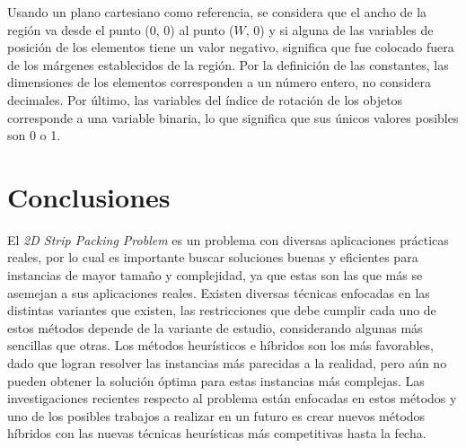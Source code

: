 \documentclass[letter, 10pt]{article}
\begin{document}
Usando un plano cartesiano como referencia, se considera que el ancho de la regi\'on va desde el punto (0, 0) al punto ($W$, 0) y si alguna de las variables de posici\'on de los elementos tiene un valor negativo, significa que fue colocado fuera de los m\'argenes establecidos de la regi\'on. Por la definici\'on de las constantes, las dimensiones de los elementos corresponden a un n\'umero entero, no considera decimales. Por \'ultimo, las variables del \'indice de rotaci\'on de los objetos corresponde a una variable binaria, lo que significa que sus \'unicos valores posibles son 0 o 1.

\section{Conclusiones}

El \emph{2D Strip Packing Problem} es un problema con diversas aplicaciones pr\'acticas reales, por lo cual es importante buscar soluciones buenas y eficientes para instancias de mayor tama\~no y complejidad, ya que estas son las que m\'as se asemejan a sus aplicaciones reales. Existen diversas t\'ecnicas enfocadas en las distintas variantes que existen, las restricciones que debe cumplir cada uno de estos m\'etodos depende de la variante de estudio, considerando algunas m\'as sencillas que otras. Los m\'etodos heur\'isticos e h\'ibridos son los m\'as favorables, dado que logran resolver las instancias m\'as parecidas a la realidad, pero a\'un no pueden obtener la soluci\'on \'optima para estas instancias m\'as complejas. Las investigaciones recientes respecto al problema est\'an enfocadas en estos m\'etodos y uno de los posibles trabajos a realizar en un futuro es crear nuevos m\'etodos h\'ibridos con las nuevas t\'ecnicas heur\'isticas m\'as competitivas hasta la fecha. 



\end{document}
